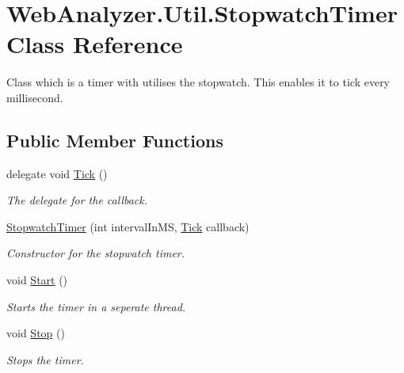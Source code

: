\hypertarget{class_web_analyzer_1_1_util_1_1_stopwatch_timer}{}\section{Web\+Analyzer.\+Util.\+Stopwatch\+Timer Class Reference}
\label{class_web_analyzer_1_1_util_1_1_stopwatch_timer}


Class which is a timer with utilises the stopwatch. This enables it to tick every millisecond.  


\subsection*{Public Member Functions}
\begin{DoxyCompactItemize}
\item 
delegate void \hyperlink{class_web_analyzer_1_1_util_1_1_stopwatch_timer_a5670fcf49435ed5d241abd0617c9f607}{Tick} ()
\begin{DoxyCompactList}\small\item\em The delegate for the callback. \end{DoxyCompactList}\item 
\hyperlink{class_web_analyzer_1_1_util_1_1_stopwatch_timer_a1b411ff5e4314d1960220119bdcfee9f}{Stopwatch\+Timer} (int interval\+In\+M\+S, \hyperlink{class_web_analyzer_1_1_util_1_1_stopwatch_timer_a5670fcf49435ed5d241abd0617c9f607}{Tick} callback)
\begin{DoxyCompactList}\small\item\em Constructor for the stopwatch timer. \end{DoxyCompactList}\item 
void \hyperlink{class_web_analyzer_1_1_util_1_1_stopwatch_timer_acfa101ef1134f8236820a7c9c673342f}{Start} ()
\begin{DoxyCompactList}\small\item\em Starts the timer in a seperate thread. \end{DoxyCompactList}\item 
void \hyperlink{class_web_analyzer_1_1_util_1_1_stopwatch_timer_a61fc2ce06941c2681e451916c09d2f1e}{Stop} ()
\begin{DoxyCompactList}\small\item\em Stops the timer. \end{DoxyCompactList}\end{DoxyCompactItemize}

